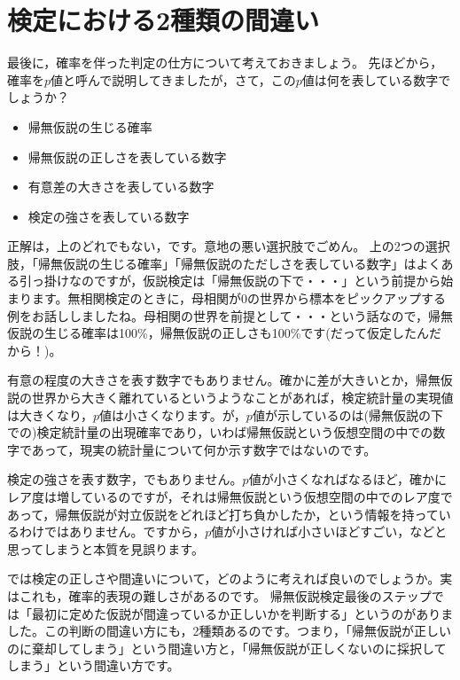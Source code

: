 \documentclass{ltjsarticle}
\begin{document}
\section{検定における2種類の間違い}
\label{sec::18_05}
最後に，確率を伴った判定の仕方について考えておきましょう。
先ほどから，確率を$p$値と呼んで説明してきましたが，さて，この$p$値は何を表している数字でしょうか？ 

\begin{itemize}
    \item 帰無仮説の生じる確率
    \item 帰無仮説の正しさを表している数字
    \item 有意差の大きさを表している数字
    \item 検定の強さを表している数字
\end{itemize}

正解は，上のどれでもない，です。意地の悪い選択肢でごめん。
上の2つの選択肢，「帰無仮説の生じる確率」「帰無仮説のただしさを表している数字」はよくある引っ掛けなのですが，仮説検定は「帰無仮説の下で・・・」という前提から始まります。無相関検定のときに，母相関が0の世界から標本をピックアップする例をお話ししましたね。母相関の世界を前提として・・・という話なので，帰無仮説の生じる確率は100\%，帰無仮説の正しさも100\%です(だって仮定したんだから！)。

有意の程度の大きさを表す数字でもありません。確かに差が大きいとか，帰無仮説の世界から大きく離れているというようなことがあれば，検定統計量の実現値は大きくなり，$p$値は小さくなります。が，$p$値が示しているのは(帰無仮説の下での)検定統計量の出現確率であり，いわば帰無仮説という仮想空間の中での数字であって，現実の統計量について何か示す数字ではないのです。

検定の強さを表す数字，でもありません。$p$値が小さくなればなるほど，確かにレア度は増しているのですが，それは帰無仮説という仮想空間の中でのレア度であって，帰無仮説が対立仮説をどれほど打ち負かしたか，という情報を持っているわけではありません。ですから，$p$値が小さければ小さいほどすごい，などと思ってしまうと本質を見誤ります。

では検定の正しさや間違いについて，どのように考えれば良いのでしょうか。実はこれも，確率的表現の難しさがあるのです。
帰無仮説検定最後のステップでは「最初に定めた仮説が間違っているか正しいかを判断する」というのがありました。この判断の間違い方にも，2種類あるのです。つまり，「帰無仮説が正しいのに棄却してしまう」という間違い方と，「帰無仮説が正しくないのに採択してしまう」という間違い方です。
\end{document}
